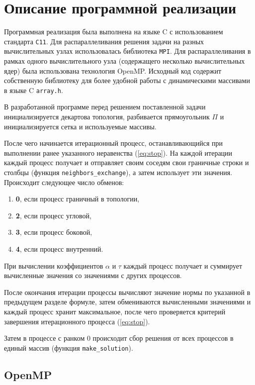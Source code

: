 \section{Описание программной реализации}

Программная реализация была выполнена на языке C с использованием стандарта \texttt{C11}. Для распараллеливания решения задачи на разных вычислительных узлах использовалась библиотека \texttt{MPI}. Для распараллеливания в рамках одного вычислительного узла (содержащего несколько вычислительных ядер) была использована технология OpenMP. Исходный код содержит собственную библиотеку для более удобной работы с динамическими массивами в языке C \texttt{array.h}.

В разработанной программе перед решением поставленной задачи инициализируется декартова топология, разбивается прямоугольник $\Pi$ и инициализируется сетка и используемые массивы.

После чего начинается итерационный процесс, останавливающийся при выполнении ранее указанного неравенства (\ref{eq:stop}). На каждой итерации каждый процесс получает и отправляет своим соседям свои граничные строки и столбцы (функция \texttt{neighbors\_exchange}), а затем использует эти значения. Происходит следующее число обменов:
\begin{enumerate}[label=\arabic*)]
  \item \textbf{0}, если процесс граничный в топологии,
  \item \textbf{2}, если процесс угловой,
  \item \textbf{3}, если процесс боковой,
  \item \textbf{4}, если процесс внутренний.
\end{enumerate}

При вычислении коэффициентов $\alpha$ и $\tau$ каждый процесс получает и суммирует вычисленные значения со значениями с других процессов.

После окончания итерации процессы вычисляют значение нормы по указанной в предыдущем разделе формуле, затем обмениваются вычисленными значениями и каждый процесс хранит максимальное, после чего проверяется критерий завершения итерационного процесса (\ref{eq:stop}).

Затем в процессе с ранком 0 происходит сбор решения от всех процессов в единый массив (функция \texttt{make\_solution}).

\subsection{OpenMP}

